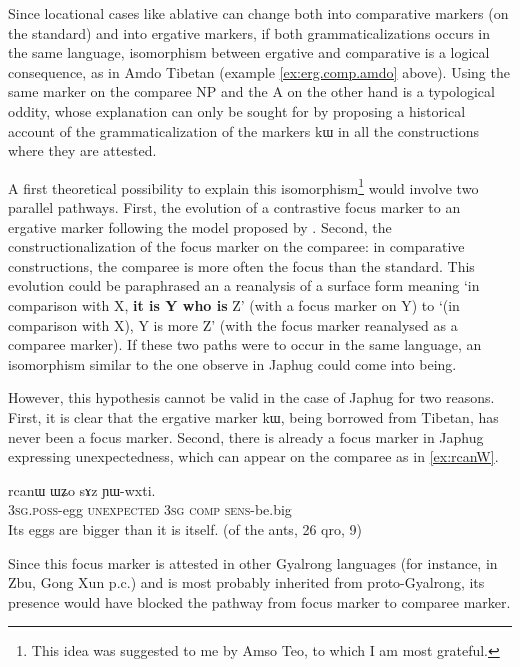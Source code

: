 \documentclass[oldfontcommands,oneside,a4paper,11pt]{article}
\newcommand{\ipa}[1]{{\phon #1}} %
\begin{document}
Since   locational cases like ablative can change both into comparative markers (on the standard) and  into ergative markers, if both grammaticalizations occurs in the same language, isomorphism between ergative and comparative is a logical consequence, as in Amdo Tibetan (example \ref{ex:erg.comp.amdo} above).
Using the same marker on the comparee NP and the A on the other hand is a typological oddity, whose explanation can only be sought for by proposing a historical account of the grammaticalization of the markers \ipa{kɯ} in all the constructions where they are attested.

A first theoretical possibility to explain this isomorphism\footnote{This idea was suggested to me by Amso Teo, to which I am most grateful.} would involve two parallel pathways. First, the evolution of a contrastive focus marker to an ergative marker following the model proposed by \citealt{gaby10thaayorre.ergative}. Second, the constructionalization of the focus marker on the comparee: in comparative constructions, the comparee is more often the focus than the standard. This evolution could be paraphrased an a reanalysis of a surface form meaning `in comparison with X, \textbf{it is Y who is}  Z' (with a focus marker on Y) to  `(in comparison with X), Y is more  Z' (with the focus marker reanalysed as a comparee marker). 
If these two paths were to occur in the same language, an isomorphism similar to the one observe in Japhug could come into being.

However, this hypothesis cannot be valid in the case of Japhug for two reasons. First, it is clear that the ergative marker \ipa{kɯ}, being borrowed from Tibetan, has never been a focus marker. Second,  there is already a focus marker in Japhug expressing unexpectedness, which can appear on the comparee as in \ref{ex:rcanW}.

\begin{exe}
\ex \label{ex:rcanW}
\gll   \ipa{ɯ-ŋgɯm} 	\ipa{rcanɯ} 	\ipa{ɯʑo} 	\ipa{sɤz} 	\ipa{ɲɯ-wxti.} 	 \\
\textsc{3sg.poss}-egg \textsc{unexpected} \textsc{3sg} \textsc{comp} \textsc{sens}-be.big \\
\glt Its eggs are bigger than it is itself. (of the ants, 26 qro, 9)
\end{exe}

Since this focus marker is attested in other Gyalrong languages (for instance, in Zbu, Gong Xun p.c.) and is most probably inherited from proto-Gyalrong, its presence would have blocked the pathway from focus marker to  comparee marker. 
\end{document}
